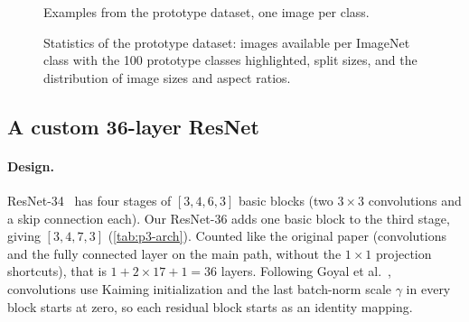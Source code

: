 \begin{figure}[t]
  \centering
  \caption{Examples from the prototype dataset, one image per class.}
  \label{fig:p3-proto-samples}
\end{figure}

\begin{figure}[t]
  \centering
  \caption{Statistics of the prototype dataset: images available per ImageNet class with the 100 prototype classes highlighted, split sizes, and the distribution of image sizes and aspect ratios.}
  \label{fig:p3-proto-stats}
\end{figure}

\subsection{A custom 36-layer ResNet}
\label{sec:p3-resnet36}

\paragraph{Design.}
ResNet-34~\cite{he2016resnet} has four stages of $[3,4,6,3]$ basic blocks (two $3\times3$ convolutions and a skip connection each).
Our ResNet-36 adds one basic block to the third stage, giving $[3,4,7,3]$ (\cref{tab:p3-arch}).
Counted like the original paper (convolutions and the fully connected layer on the main path, without the $1\times1$ projection shortcuts), that is $1+2\times17+1=36$ layers.
Following Goyal et al.~\cite{goyal2017accurate}, convolutions use Kaiming initialization and the last batch-norm scale $\gamma$ in every block starts at zero, so each residual block starts as an identity mapping.

